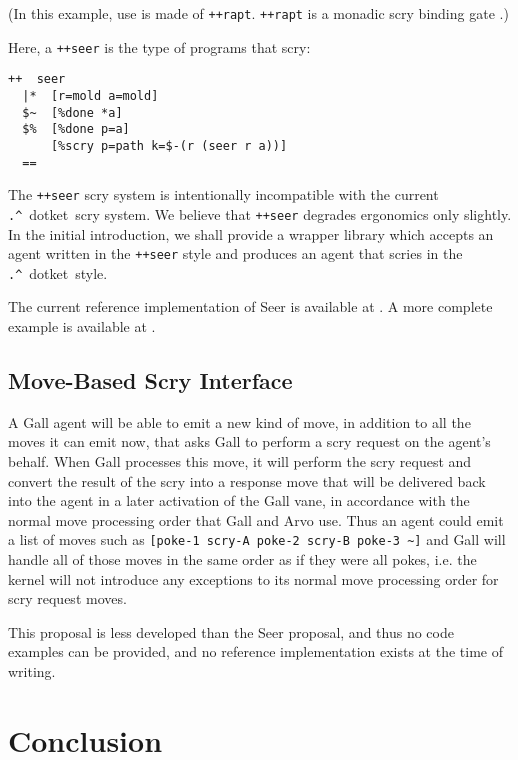 \documentclass[twoside]{article}
\newcommand{\dotket}{\lstinline[style=inlinecode]{.^}~dotket}
\begin{document}
\noindent
(In this example, use is made of \lstinline[style=inlinecode]{++rapt}.  \lstinline[style=inlinecode]{++rapt} is a monadic scry binding gate \citep{Levan2023b}.)

Here, a \lstinline[style=inlinecode]{++seer} is the type of programs that scry:

\begin{lstlisting}[style=listingcode]
++  seer
  |*  [r=mold a=mold]
  $~  [%done *a]
  $%  [%done p=a]
      [%scry p=path k=$-(r (seer r a))]
  ==
\end{lstlisting}

The \lstinline[style=inlinecode]{++seer} scry system is intentionally incompatible with the current \dotket~scry system.  We believe that \lstinline[style=inlinecode]{++seer} degrades ergonomics only slightly.  In the initial introduction, we shall provide a wrapper library which accepts an agent written in the \lstinline[style=inlinecode]{++seer} style and produces an agent that scries in the \dotket~style.

The current reference implementation of Seer is available at .  A more complete example is available at \citealt{Levan2023a}.

\subsection{Move-Based Scry Interface}

A Gall agent will be able to emit a new kind of move, in addition to all the moves it can emit now, that asks Gall to perform a scry request on the agent's behalf.  When Gall processes this move, it will perform the scry request and convert the result of the scry into a response move that will be delivered back into the agent in a later activation of the Gall vane, in accordance with the normal move processing order that Gall and Arvo use.  Thus an agent could emit a list of moves such as \lstinline[style=inlinecode]{[poke-1 scry-A poke-2 scry-B poke-3 ~]} and Gall will handle all of those moves in the same order as if they were all pokes, i.e. the kernel will not introduce any exceptions to its normal move processing order for scry request moves.

This proposal is less developed than the Seer proposal, and thus no code examples can be provided, and no reference implementation exists at the time of writing.


\section{Conclusion}
\end{document}
